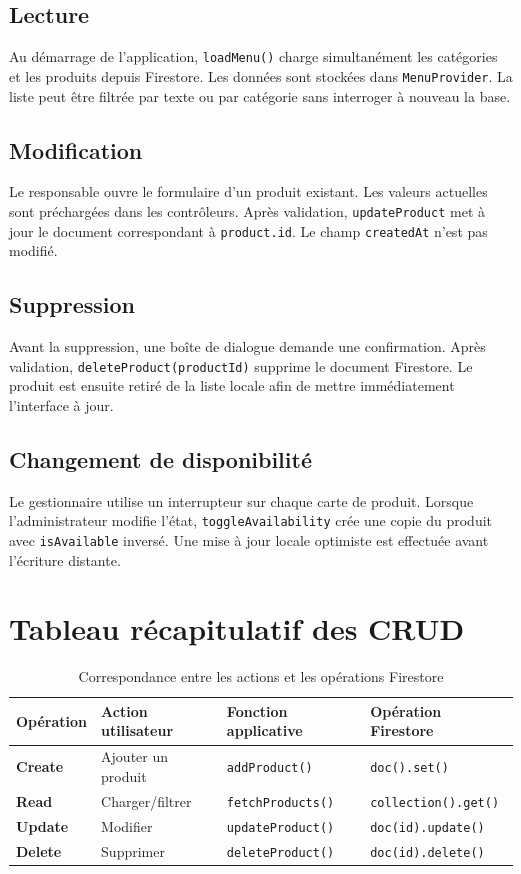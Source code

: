 \documentclass[12pt,a4paper]{report}
\begin{document}
\subsection{Lecture}

Au démarrage de l'application, \texttt{loadMenu()} charge simultanément les catégories
et les produits depuis Firestore. Les données sont stockées dans
\texttt{MenuProvider}. La liste peut être filtrée par texte ou par catégorie sans
interroger à nouveau la base.

\subsection{Modification}

Le responsable ouvre le formulaire d'un produit existant. Les valeurs actuelles
sont préchargées dans les contrôleurs. Après validation, \texttt{updateProduct}
met à jour le document correspondant à \texttt{product.id}. Le champ
\texttt{createdAt} n'est pas modifié.

\subsection{Suppression}

Avant la suppression, une boîte de dialogue demande une confirmation. Après
validation, \texttt{deleteProduct(productId)} supprime le document Firestore.
Le produit est ensuite retiré de la liste locale afin de mettre immédiatement
l'interface à jour.

\subsection{Changement de disponibilité}

Le gestionnaire utilise un interrupteur sur chaque carte de produit. Lorsque
l'administrateur modifie l'état, \texttt{toggleAvailability} crée une copie du
produit avec \texttt{isAvailable} inversé. Une mise à jour locale optimiste est
effectuée avant l'écriture distante.

\section{Tableau récapitulatif des CRUD}

\begin{table}[H]
\centering
\caption{Correspondance entre les actions et les opérations Firestore}
\begin{tabularx}{\textwidth}{>{\bfseries}p{2.5cm}p{3cm}p{4.1cm}X}
\toprule
Opération & Action utilisateur & Fonction applicative & Opération Firestore \\
\midrule
Create & Ajouter un produit & \texttt{addProduct()} & \texttt{doc().set()} \\
Read & Charger/filtrer & \texttt{fetchProducts()} & \texttt{collection().get()} \\
Update & Modifier & \texttt{updateProduct()} & \texttt{doc(id).update()} \\
Delete & Supprimer & \texttt{deleteProduct()} & \texttt{doc(id).delete()} \\
\bottomrule
\end{tabularx}
\end{table}
\end{document}
